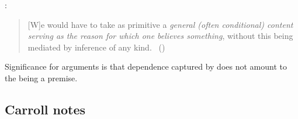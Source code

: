 \begin{note}
  \citeauthor{Boghossian:2008vf}:
  \begin{quote}
    [W]e would have to take as primitive a \emph{general (often conditional) content serving as the reason for which one believes something}, without this being mediated by inference of any kind.%
    \mbox{ }\hfill\mbox{(\citeyear[500]{Boghossian:2008vf})}
  \end{quote}
\end{note}

\begin{note}
  Significance for arguments is that dependence captured by \qWhyVnP{} does not amount to the \ros{} being a premise.
\end{note}

\subsection{Carroll notes}

